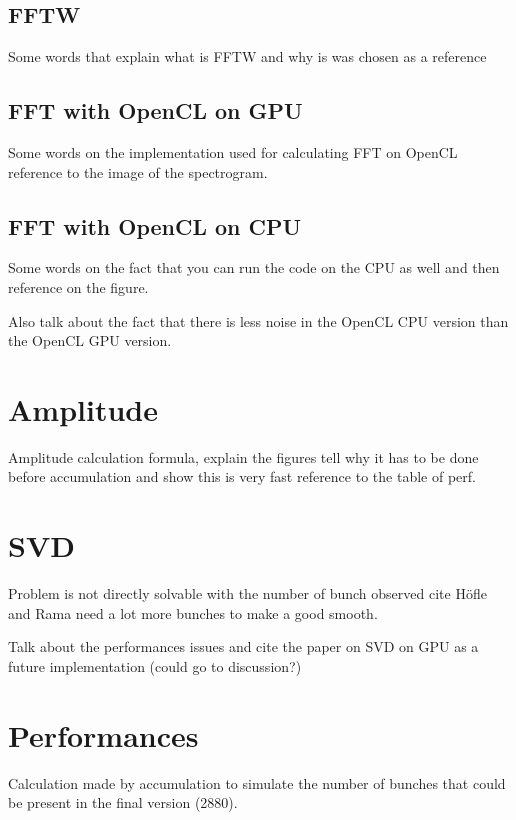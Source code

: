    \subsection{FFTW}

   Some words that explain what is FFTW and why is was chosen as a reference

   \subsection{FFT with OpenCL on GPU}

   Some words on the implementation used for calculating FFT on OpenCL reference to the image of the spectrogram.

   \subsection{FFT with OpenCL on CPU}

   Some words on the fact that you can run the code on the CPU as well and then reference on the figure.

   Also talk about the fact that there is less noise in the OpenCL CPU version than the OpenCL GPU version.

\section{Amplitude}
\label{sec:amplitude}

Amplitude calculation formula, explain the figures tell why it has to be done before accumulation and show this is very fast reference to the table of perf.

\section{SVD}
\label{sec:SVD}

Problem is not directly solvable with the number of bunch observed cite H{\"o}fle and Rama need a lot more bunches to make a good smooth\cite{calaga06}. 

Talk about the performances issues and cite the paper on SVD on GPU as a future implementation (could go to discussion?)\cite{Lahabar09}

\section{Performances}

Calculation made by accumulation to simulate the number of bunches that could be present in the final version (2880).

